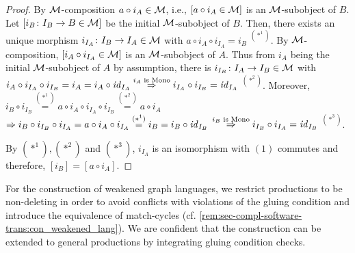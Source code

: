 \begin{proof}
By ${\cal M}$-composition $a \circ i_A \in {\cal M}$, i.e., $[a \circ i_A \in {\cal M}]$ is an ${\cal M}$-subobject of $B$.
Let $[i_B\colon I_B \to B \in {\cal M}]$ be the initial ${\cal M}$-subobject of $B$.
Then, there exists an unique morphism $i_{I_A}\colon I_B \to I_A \in {\cal M}$ with $a \circ i_A \circ i_{I_A}=i_B$ $^{(*^1)}$.
By ${\cal M}$-composition, $[i_A \circ i_{I_A} \in {\cal M}]$ is an ${\cal M}$-subobject of $A$.
Thus from $i_A$ being the initial ${\cal M}$-subobject of $A$ by assumption, there is $i_{I_B}\colon I_A \to I_B \in {\cal M}$ with $i_A \circ i_{I_A} \circ i_{I_B}=i_A=i_A \circ \mathit{id}_{I_A} \stackrel{i_A\text{ is Mono}}{\Rightarrow} i_{I_A} \circ i_{I_B}=\mathit{id}_{I_A}$ $^{(*^2)}$.
Moreover, $i_B \circ i_{I_B}\stackrel{(*^1)}{=}a \circ i_A \circ i_{I_A} \circ i_{I_B} \stackrel{(*^2)}{=} a \circ i_A$ $\Rightarrow i_B \circ i_{I_B} \circ i_{I_A}=a \circ i_A \circ i_{I_A} \stackrel{(*^1)}{=} i_B=i_B \circ \mathit{id}_{I_B}$ $\stackrel{i_B\text{ is Mono}}{\Rightarrow} i_{I_B} \circ i_{I_A}=\mathit{id}_{I_B}$ $^{(*^3)}$.
\begin{center}
\end{center}
By $(*^1),(*^2)$ and $(*^3)$, $i_{I_A}$ is an isomorphism with $(1)$ commutes and therefore, $[i_B]=[a \circ i_A]$.
\end{proof}

For the construction of weakened graph languages, we restrict productions to be non-deleting in order to avoid conflicts with violations of the gluing condition and introduce the equivalence of match-cycles (cf. \cref{rem:sec-compl-software-trans:con_weakened_lang}).
We are confident that the construction can be extended to general productions by integrating gluing condition checks.

